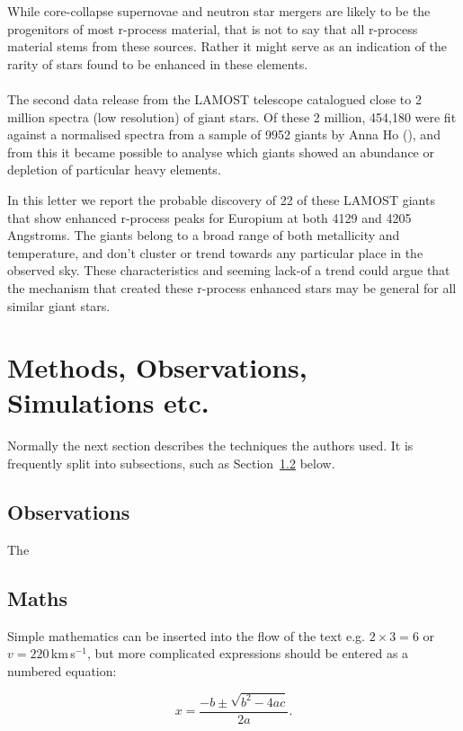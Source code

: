 \documentclass[a4paper,fleqn,usenatbib]{mnras}
\begin{document}
While core-collapse supernovae and neutron star mergers are likely to be the progenitors of most r-process material, that is not to say that all r-process material stems from these sources. Rather it might serve as an indication of the rarity of stars found to be enhanced in these elements. 
\\\\
The second data release from the LAMOST telescope catalogued close to 2 million spectra (low resolution) of giant stars. Of these 2 million, 454,180 were fit against a normalised spectra from a sample of 9952 giants by Anna Ho (\cite{AnnaHo2017}), and from this it became possible to analyse which giants showed an abundance or depletion of particular heavy elements. 

In this letter we report the probable discovery of 22 of these LAMOST giants that show enhanced r-process peaks for Europium at both 4129 and 4205 Angstroms. The giants belong to a broad range of both metallicity and temperature, and don't cluster or trend towards any particular place in the observed sky. These characteristics and seeming lack-of a trend could argue that the mechanism that created these r-process enhanced stars may be general for all similar giant stars. 



\section{Methods, Observations, Simulations etc.}
Normally the next section describes the techniques the authors used.
It is frequently split into subsections, such as Section~\ref{sec:maths} below.

\subsection{Observations}
The 

\subsection{Maths}
\label{sec:maths} 

Simple mathematics can be inserted into the flow of the text e.g. $2\times3=6$
or $v=220$\,km\,s$^{-1}$, but more complicated expressions should be entered
as a numbered equation:

\begin{equation}
    x=\frac{-b\pm\sqrt{b^2-4ac}}{2a}.
	\label{eq:quadratic}
\end{equation}
\end{document}
